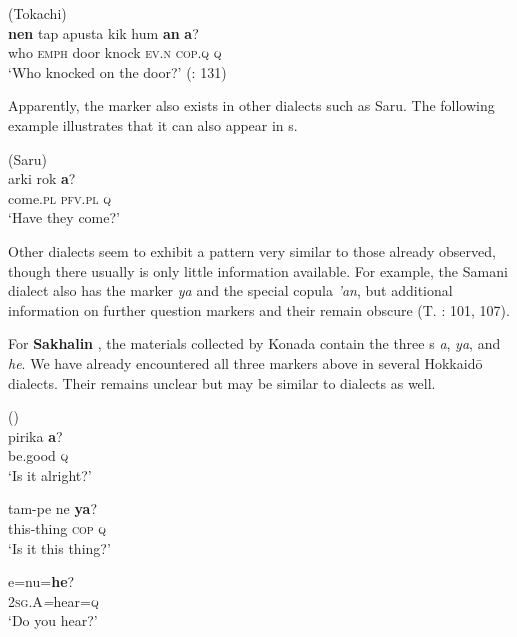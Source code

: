 \ea%
    \label{ex:ainu:18}
     (Tokachi)\\
    \gll \textbf{{nen}} tap apusta kik hum \textbf{{an}} \textbf{{a}}?\\
    who  \textsc{emph}  door  knock  \textsc{ev.n}  \textsc{cop.q}  \textsc{q}\\
    \glt ‘Who knocked on the door?’ (\citealt{Takahashi2013}: 131)
    \z

Apparently, the marker also exists in other dialects such as Saru. The following example illustrates that it can also appear in s.

\ea%
    \label{ex:ainu:19}
     (Saru)\\
    \gll arki    rok \textbf{{a}}?\\
    come.\textsc{pl}  \textsc{pfv}.\textsc{pl}  \textsc{q}\\
    \glt ‘Have they come?’ \citep[79]{Shibatani1990}
    \z

Other  dialects seem to exhibit a pattern very similar to those already observed, though there usually is only little information available. For example, the Samani dialect also has the marker \textit{ya} and the special  copula \textit{’an}, but additional information on further question markers and their  remain obscure (T. \citealt{Sato2002}: 101, 107).

For \textbf{Sakhalin} , the materials collected by Konada \citep{Tittel1922} contain the three s \textit{a}, \textit{ya}, and \textit{he}. We have already encountered all three markers above in several Hokkaid\=o dialects. Their  remains unclear but may be similar to  dialects as well.

\ea%
    \label{ex:ainu:20}
     ()\\
    \ea
    \gll pirika \textbf{{a}}?\\
    be.good  \textsc{q}\\
    \glt ‘Is it alright?’

    \ex
    \gll tam-pe    ne \textbf{{ya}}?\\
    this-thing  \textsc{cop}  \textsc{q}\\
    \glt ‘Is it this thing?’
 
    \ex
    \gll e=nu=\textbf{{he}}?\\
    2\textsc{sg.A}\textit{=}hear=\textsc{q}\\
    \glt ‘Do you hear?’ \citep[85]{Tittel1922}
    \z
    \z 

